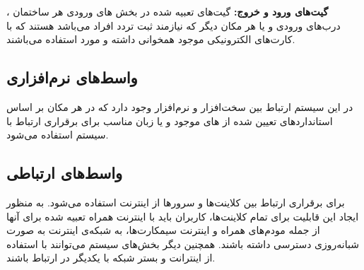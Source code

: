 \documentclass[oneside,a4paper,12pt]{book}
\begin{document}
	\noindent\textbf{گیت‌های ورود و خروج:} گیت‌های تعبیه شده در بخش های ورودی هر ساختمان ، درب‌های ورودی و یا هر مکان دیگر که نیازمند ثبت تردد افراد می‌باشد هستند که با کارت‌های الکترونیکی موجود همخوانی داشته و مورد استفاده می‌باشند.
	
	\subsection{واسط‌های نرم‌افزاری}
	در این سیستم ارتباط بین سخت‌افزار و نرم‌افزار وجود دارد که در هر مکان بر اساس استانداردهای تعیین شده از   های موجود و یا زبان مناسب برای برقراری ارتباط با سیستم استفاده می‌شود.
	\subsection{واسط‌های ارتباطی}
	برای برقراری ارتباط بین کلاینت‌ها و سرورها از اینترنت استفاده می‌شود. به منظور ایجاد این قابلیت برای تمام
	کلاینت‌ها، کاربران باید با اینترنت همراه تعبیه شده برای آنها از جمله مودم‌های همراه و اینترنت سیمکارت‌ها، به
	شبکه‌ی اینترنت به صورت شبانه‌روزی دسترسی داشته باشند. همچنین دیگر بخش‌های سیستم می‌توانند با استفاده از اینترانت و بستر شبکه با یکدیگر در ارتباط باشند.
	
\end{document}
